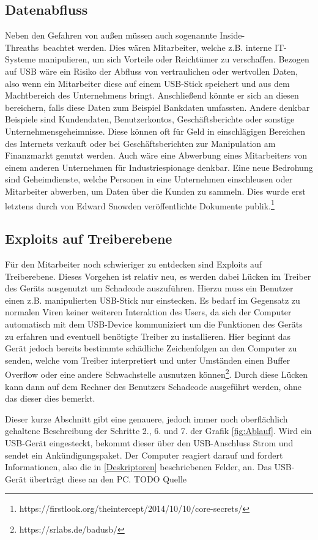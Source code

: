 \subsection{Datenabfluss}
Neben den Gefahren von außen müssen auch sogenannte \glqq Inside-Threaths\grqq \ beachtet werden. Dies wären Mitarbeiter, welche z.B. interne IT-Systeme manipulieren, um sich Vorteile oder Reichtümer zu verschaffen. Bezogen auf USB wäre ein Risiko der Abfluss von vertraulichen oder wertvollen Daten, also wenn ein Mitarbeiter diese auf einem USB-Stick speichert und aus dem Machtbereich des Unternehmens bringt. Anschließend könnte er sich an diesen bereichern, falls diese Daten zum Beispiel Bankdaten umfassten. Andere denkbar Beispiele sind Kundendaten, Benutzerkontos, Geschäftsberichte oder sonstige Unternehmensgeheimnisse. Diese können oft für Geld in einschlägigen Bereichen des Internets verkauft oder bei Geschäftsberichten zur Manipulation am Finanzmarkt genutzt werden. Auch wäre eine Abwerbung eines Mitarbeiters von einem anderen Unternehmen für Industriespionage denkbar.
Eine neue Bedrohung sind Geheimdienste, welche Personen in eine Unternehmen einschleusen oder Mitarbeiter abwerben, um Daten über die Kunden zu sammeln. Dies wurde erst letztens durch von Edward Snowden veröffentlichte Dokumente publik.\footnote{https://firstlook.org/theintercept/2014/10/10/core-secrets/}

\subsection{Exploits auf Treiberebene}
Für den Mitarbeiter noch schwieriger zu entdecken sind Exploits auf Treiberebene. Dieses Vorgehen ist relativ neu, es werden dabei Lücken im Treiber des Geräts ausgenutzt um Schadcode auszuführen. Hierzu muss ein Benutzer einen z.B. manipulierten USB-Stick nur einstecken. Es bedarf im Gegensatz zu normalen Viren keiner weiteren Interaktion des Users, da sich der Computer automatisch mit dem USB-Device kommuniziert um die Funktionen des Geräts zu erfahren und eventuell benötigte Treiber zu installieren. Hier beginnt das Gerät jedoch bereits bestimmte schädliche Zeichenfolgen an den  Computer zu senden, welche vom Treiber interpretiert und unter Umständen einen Buffer Overflow  oder eine andere Schwachstelle ausnutzen können\footnote{https://srlabs.de/badusb/}. Durch diese Lücken kann dann auf dem Rechner des Benutzers Schadcode ausgeführt werden, ohne das dieser dies bemerkt.

Dieser kurze Abschnitt gibt eine genauere, jedoch immer noch oberflächlich gehaltene Beschreibung der Schritte 2., 6. und 7. der Grafik \ref{fig:Ablauf}. Wird ein USB-Gerät eingesteckt, bekommt dieser über den USB-Anschluss Strom und sendet ein Ankündigungspaket. Der Computer reagiert darauf und fordert Informationen, also die in \ref{Deskriptoren} beschriebenen Felder, an. Das USB-Gerät überträgt diese an den PC. TODO Quelle

